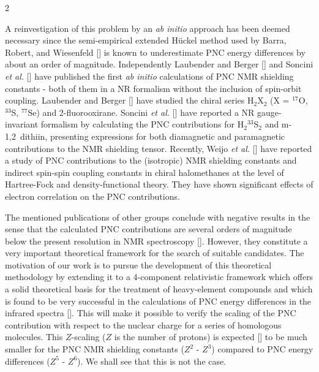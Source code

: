 \documentclass[a4paper,12pt,english]{article}
\begin{document}
\begin{spacing}{2}
\par A reinvestigation of this problem by an \emph{ab initio} approach has been deemed necessary since the semi-empirical extended H\"uckel method used by Barra, Robert, and Wiesenfeld [\cite{barra1986physletta,barra1988europhyslett}] is known to underestimate PNC energy differences by about an order of magnitude. Independently Laubender and Berger [\cite{berger2003chemphyschem}] and Soncini \emph{et al.} [\cite{lazzeretti2003physreva}] have published the first \emph{ab initio} calculations of PNC NMR shielding constants - both of them in a NR formalism without the inclusion of spin-orbit coupling. Laubender and Berger [\cite{berger2003chemphyschem}] have studied the chiral series H$_2$X$_2$ (X = $^{17}$O, $^{33}$S, $^{77}$Se) and 2-fluorooxirane. Soncini \emph{et al.} [\cite{lazzeretti2003physreva}] have reported a NR gauge-invariant formalism by calculating the PNC contributions for H$_2{^{33}}$S$_2$ and \mbox{m-1,2 dithiin}, presenting expressions for both diamagnetic and paramagnetic contributions to the NMR shielding tensor. Recently, Weijo \emph{et al.} [\cite{weijo2000jchemphys}] have reported a study of PNC contributions to the (isotropic) NMR shielding constants and indirect spin-spin coupling constants in chiral halomethanes at the level of Hartree-Fock and density-functional theory. They have shown significant effects of electron correlation on the PNC contributions.

\par The mentioned publications of other groups conclude with negative results in the sense that the calculated PNC contributions are several orders of magnitude below the present resolution in NMR spectroscopy [\cite{barra2001chirality}]. However, they constitute a very important theoretical frame\-work for the search of suitable candidates. The motivation of our work is to pursue the development of this theoretical methodology by extending it to a 4-component relativistic framework which offers a solid theoretical basis for the treatment of heavy-element compounds and which is found to be very successful in the calculations of PNC energy differences in the infrared spectra [\cite{schwerdtfeger2000physrevlett,schwerdtfeger2002physreva,schwerdtfeger2003physrevlett,schwerdtfeger2004jamchemsoc}]. This will make it possible to verify the scaling of the PNC contribution with respect to the nuclear charge for a series of homologous molecules. This $Z$-scaling ($Z$ is the number of protons) is expected [\cite{berger2003chemphyschem}] to be much smaller for the PNC NMR shielding constants ($Z^2$ - $Z^3$) compared to PNC energy differences ($Z^5$ - $Z^6$). We shall see that this is not the case.


\end{spacing}
\end{document}
